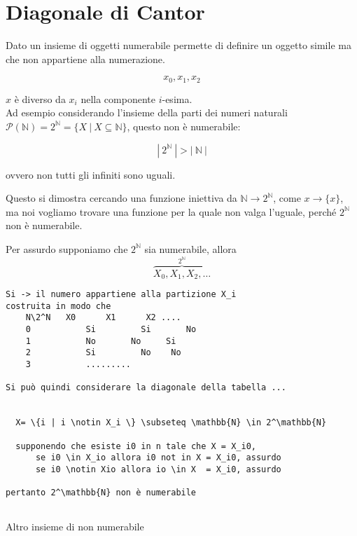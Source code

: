 \section{Diagonale di Cantor}

Dato un insieme di oggetti numerabile permette di definire un oggetto simile ma che non appartiene alla numerazione.

$$
x_0, x_1, x_2
$$

$ x $ è diverso da $ x_i $ nella componente $ i $-esima.\\

Ad esempio considerando l'insieme della parti dei numeri naturali $ \mathcal{P}(\mathbb{N}) =2^\mathbb{N} =  \{X \: | \: X \subseteq \mathbb{N} \} $, questo non è numerabile:

$$
|\: 2^\mathbb{N}  \:| > |\:\mathbb{N}\:|
$$

ovvero non tutti gli infiniti sono uguali.

Questo si dimostra cercando una funzione iniettiva da $ \mathbb{N} \rightarrow 2^\mathbb{N} $, come $ x \rightarrow \{x\} $, ma noi vogliamo trovare una funzione per la quale non valga l'uguale, perché $ 2^\mathbb{N} $ non è numerabile.

Per assurdo supponiamo che $ 2^\mathbb{N} $ sia numerabile, allora $$ \overbrace{X_0, X_1, X_2, \ldots}^{2^\mathbb{N}} $$

\begin{verbatim}
Si -> il numero appartiene alla partizione X_i
costruita in modo che 
	N\2^N	X0		X1		X2 ....
	0			Si		   Si		No
	1			No       No     Si
	2			Si	       No    No
	3			.........

Si può quindi considerare la diagonale della tabella ...


  X= \{i | i \notin X_i \} \subseteq \mathbb{N} \in 2^\mathbb{N}
  
  supponendo che esiste i0 in n tale che X = X_i0, 
	  se i0 \in X_io allora i0 not in X = X_i0, assurdo
	  se i0 \notin Xio allora io \in X  = X_i0, assurdo

pertanto 2^\mathbb{N} non è numerabile  
	
\end{verbatim}

Altro insieme di non numerabile

